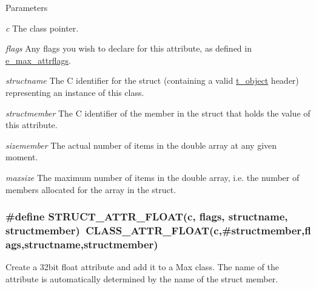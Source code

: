 \begin{DoxyParams}{Parameters}
\item[{\em c}]The class pointer. \item[{\em flags}]Any flags you wish to declare for this attribute, as defined in \hyperlink{group__attr_gaf296cfc6741bb19207f6ed8062809115}{e\_\-max\_\-attrflags}. \item[{\em structname}]The C identifier for the struct (containing a valid \hyperlink{structt__object}{t\_\-object} header) representing an instance of this class. \item[{\em structmember}]The C identifier of the member in the struct that holds the value of this attribute. \item[{\em sizemember}]The actual number of items in the double array at any given moment. \item[{\em maxsize}]The maximum number of items in the double array, i.e. the number of members allocated for the array in the struct. \end{DoxyParams}
\hypertarget{group__attr_ga91cdbfa68b1aba7de92405221131d770}{
\subsubsection[{STRUCT\_\-ATTR\_\-FLOAT}]{\setlength{\rightskip}{0pt plus 5cm}\#define STRUCT\_\-ATTR\_\-FLOAT(c, \/  flags, \/  structname, \/  structmember)~CLASS\_\-ATTR\_\-FLOAT(c,\#structmember,flags,structname,structmember)}}
\label{group__attr_ga91cdbfa68b1aba7de92405221131d770}


Create a 32bit float attribute and add it to a Max class. The name of the attribute is automatically determined by the name of the struct member.


